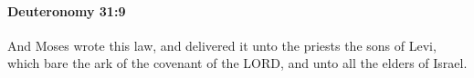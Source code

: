 
		\paragraph{Deuteronomy 31:9} %
			\label{DEUTERONOMY-31-9}

			And Moses wrote this law, and delivered it unto the priests the sons of Levi, which bare the ark of the covenant of the LORD, and unto all the elders of Israel.


